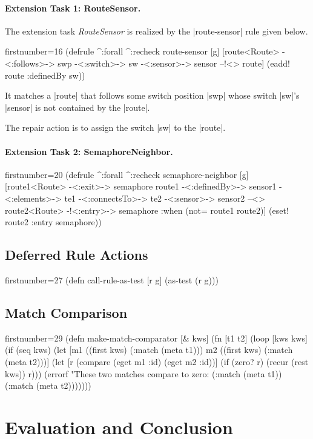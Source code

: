 \documentclass[submission]{eptcs}
\newcommand{\code}{\clojureinline}
\begin{document}
\paragraph{Extension Task 1: RouteSensor.}

The extension task \emph{RouteSensor} is realized by the \code|route-sensor|
rule given below.

\begin{clojurecode*}{firstnumber=16}
(defrule ^:forall ^:recheck route-sensor [g]
  [route<Route> -<:follows>-> swp -<:switch>-> sw
   -<:sensor>-> sensor --!<> route]
  (eadd! route :definedBy sw))
\end{clojurecode*}

It matches a \code|route| that follows some switch position \code|swp| whose
switch \code|sw|'s \code|sensor| is not contained by the \code|route|.

The repair action is to assign the switch \code|sw| to the \code|route|.


\paragraph{Extension Task 2: SemaphoreNeighbor.}

\begin{clojurecode*}{firstnumber=20}
(defrule ^:forall ^:recheck semaphore-neighbor [g]
  [route1<Route> -<:exit>-> semaphore
   route1 -<:definedBy>-> sensor1 -<:elements>-> te1
   -<:connectsTo>-> te2 -<:sensor>-> sensor2
   --<> route2<Route> -!<:entry>-> semaphore
   :when (not= route1 route2)]
  (eset! route2 :entry semaphore))
\end{clojurecode*}


\subsection{Deferred Rule Actions}
\label{sec:deferred-actions}

\begin{clojurecode*}{firstnumber=27}
(defn call-rule-as-test [r g]
  (as-test (r g)))
\end{clojurecode*}


\subsection{Match Comparison}
\label{sec:match-comparison}

\begin{clojurecode*}{firstnumber=29}
(defn make-match-comparator [& kws]
  (fn [t1 t2]
    (loop [kws kws]
      (if (seq kws)
        (let [m1 ((first kws) (:match (meta t1)))
              m2 ((first kws) (:match (meta t2)))]
          (let [r (compare (eget m1 :id) (eget m2 :id))]
            (if (zero? r)
              (recur (rest kws))
              r)))
        (errorf "These two matches compare to zero: %
                (:match (meta t1))
                (:match (meta t2)))))))
\end{clojurecode*}

\section{Evaluation and Conclusion}
\label{sec:evaluation}



\end{document}
